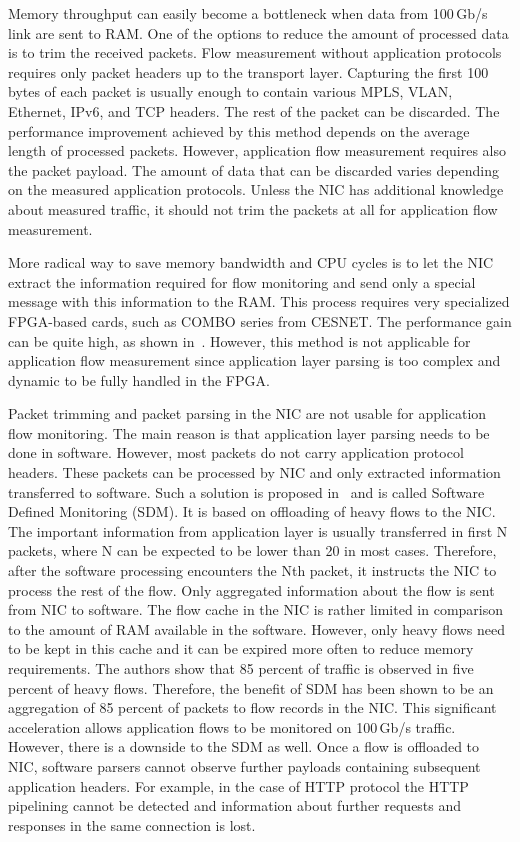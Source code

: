 Memory throughput can easily become a bottleneck when data from 100\,Gb/s link are sent to RAM. One of the options to reduce the amount of processed data is to trim the received packets. Flow measurement without application protocols requires only packet headers up to the transport layer. Capturing the first 100 bytes of each packet is usually enough to contain various MPLS, VLAN, Ethernet, IPv6, and TCP headers. The rest of the packet can be discarded. The performance improvement achieved by this method depends on the average length of processed packets. However, application flow measurement requires also the packet payload. The amount of data that can be discarded varies depending on the measured application protocols. Unless the NIC has additional knowledge about measured traffic, it should not trim the packets at all for application flow measurement.

More radical way to save memory bandwidth and CPU cycles is to let the NIC extract the information required for flow monitoring and send only a special message with this information to the RAM. This process requires very specialized FPGA-based cards, such as COMBO series from CESNET. The performance gain can be quite high, as shown in~\cite{Velan-2015-High}. However, this method is not applicable for application flow measurement since application layer parsing is too complex and dynamic to be fully handled in the FPGA.

Packet trimming and packet parsing in the NIC are not usable for application flow monitoring. The main reason is that application layer parsing needs to be done in software. However, most packets do not carry application protocol headers. These packets can be processed by NIC and only extracted information transferred to software. Such a solution is proposed in~\cite{Kekely-2016-Software} and is called Software Defined Monitoring (SDM). It is based on offloading of heavy flows to the NIC. The important information from application layer is usually transferred in first N packets, where N can be expected to be lower than 20 in most cases. Therefore, after the software processing encounters the Nth packet, it instructs the NIC to process the rest of the flow. Only aggregated information about the flow is sent from NIC to software. The flow cache in the NIC is rather limited in comparison to the amount of RAM available in the software. However, only heavy flows need to be kept in this cache and it can be expired more often to reduce memory requirements. The authors show that 85 percent of traffic is observed in five percent of heavy flows. Therefore, the benefit of SDM has been shown to be an aggregation of 85 percent of packets to flow records in the NIC. This significant acceleration allows application flows to be monitored on 100\,Gb/s traffic. However, there is a downside to the SDM as well. Once a flow is offloaded to NIC, software parsers cannot observe further payloads containing subsequent application headers. For example, in the case of HTTP protocol the HTTP pipelining cannot be detected and information about further requests and responses in the same connection is lost.

